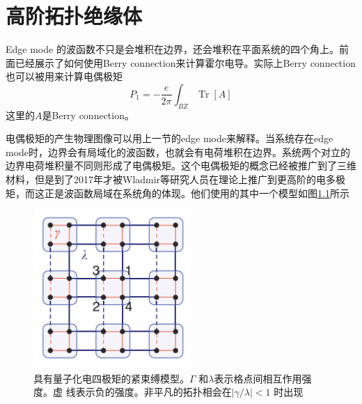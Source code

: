 \chapter{高阶拓扑绝缘体}
Edge mode 的波函数不只是会堆积在边界，还会堆积在平面系统的四个角上。前面已经展示了如何使用Berry connection来计算霍尔电导。实际上Berry connection也可以被用来计算电偶极矩
\begin{equation}
P_{1}=-\frac{e}{2 \pi} \int_{B Z} \operatorname{Tr}[A]
\end{equation}
这里的$A$是Berry connection。

电偶极矩的产生物理图像可以用上一节的edge mode来解释。当系统存在edge mode时，边界会有局域化的波函数，也就会有电荷堆积在边界。系统两个对立的边界电荷堆积量不同则形成了电偶极矩。这个电偶极矩的概念已经被推广到了三维材料，但是到了2017年才被Wladmir等研究人员在理论上推广到更高阶的电多极矩，而这正是波函数局域在系统角的体现\cite{hoti}。他们使用的其中一个模型如图\ref{hotimodel}所示
 \begin {figure}[tbp]
\centering 
\includegraphics[width=6cm]{./images/HOTIModel.png} 
\caption{具有量子化电四极矩的紧束缚模型。$\Gamma$ 和$\lambda$表示格点间相互作用强度。虚
线表示负的强度。非平凡的拓扑相会在$|\gamma / \lambda| < 1$ 时出现}
\label{hotimodel}
\end {figure} 

